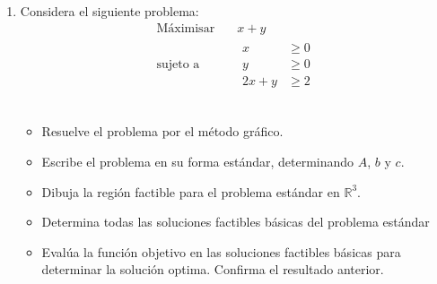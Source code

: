 \documentclass{article}
\begin{document}
\begin{enumerate}
 \item Considera el siguiente problema:
  \begin{equation*}
    \begin{aligned}
      \text{Máximisar} \quad & x+y \\
      \text{sujeto a} \quad &
      \begin{aligned}
        x & \geq 0 \\
        y & \geq 0 \\
        2x+y & \geq 2
      \end{aligned}
    \end{aligned}
  \end{equation*}
  \\
  \begin{itemize}
  \item Resuelve el problema por el método gráfico.
  \item Escribe el problema en su forma estándar, determinando $A$, $b$ y $c$.
  \item Dibuja la región factible para el problema estándar en $\mathbb{R}^3$.
  \item Determina todas las soluciones factibles básicas del problema estándar
  \item Evalúa la función objetivo en las soluciones factibles básicas para determinar la solución optima. Confirma el resultado anterior.

  \end{itemize}
\end{enumerate}
\end{document}
